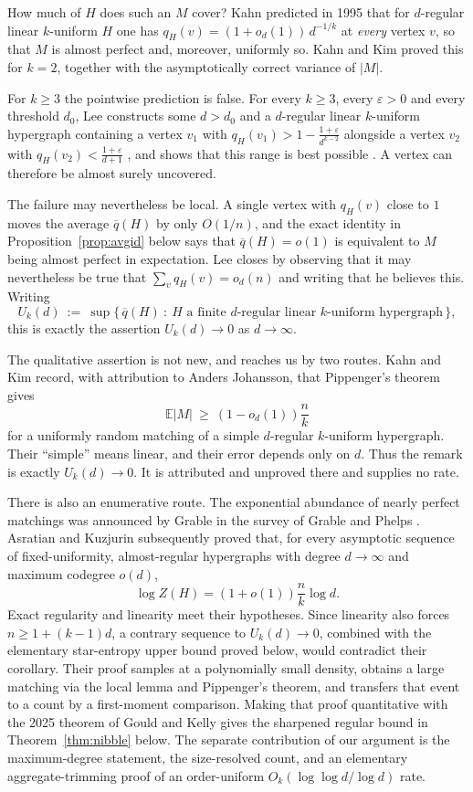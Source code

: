 \documentclass[10pt,a4paper]{amsart}
\newcommand{\EX}{\mathbb{E}}
\newcommand{\qbar}{\overline{q}}
\begin{document}
How much of $H$ does such an $M$ cover? Kahn \cite{Kahn95,Kahn97} predicted in 1995 that
for $d$-regular linear $k$-uniform $H$ one has $q_H(v)=(1+o_d(1))\,d^{-1/k}$ at
\emph{every} vertex $v$, so that $M$ is almost perfect and, moreover, uniformly so. Kahn
and Kim \cite{KahnKim98} proved this for $k=2$, together with the asymptotically correct
variance of $|M|$.

For $k\ge3$ the pointwise prediction is false. For every $k\ge3$, every
$\varepsilon>0$ and every threshold $d_0$, Lee \cite{Lee} constructs some $d>d_0$ and a
$d$-regular linear $k$-uniform hypergraph containing a vertex $v_1$ with
$q_H(v_1)>1-\frac{1+\varepsilon}{d^{k-2}}$ alongside a vertex $v_2$ with
$q_H(v_2)<\frac{1+\varepsilon}{d+1}$ \cite[Theorem 1.4]{Lee}, and shows that this range is
best possible \cite[Theorem 1.5]{Lee}. A vertex can therefore be almost surely uncovered.

The failure may nevertheless be local. A single vertex with $q_H(v)$ close to $1$ moves
the average $\qbar(H)$ by only $O(1/n)$, and the exact identity in
Proposition~\ref{prop:avgid} below says that $\qbar(H)=o(1)$ is equivalent to $M$ being
almost perfect in expectation. Lee closes \cite{Lee} by observing that it may nevertheless
be true that $\sum_v q_H(v)=o_d(n)$ and writing that he believes this.
Writing
\[
  U_k(d)\ :=\ \sup\bigl\{\,\qbar(H)\ :\ H\text{ a finite $d$-regular linear $k$-uniform
  hypergraph}\,\bigr\},
\]
this is exactly the assertion $U_k(d)\to0$ as $d\to\infty$.

The qualitative assertion is not new, and reaches us by two routes. Kahn and Kim
\cite[p.~204]{KahnKim98} record, with attribution to Anders Johansson, that Pippenger's
theorem gives
\[
  \EX|M|\ \ge\ (1-o_d(1))\frac{n}{k}
\]
for a uniformly random matching of a simple $d$-regular $k$-uniform hypergraph. Their
``simple'' means linear, and their error depends only on $d$. Thus the remark is exactly
$U_k(d)\to0$. It is attributed and unproved there and supplies no rate.

There is also an enumerative route. The exponential abundance of nearly perfect
matchings was announced by Grable in the survey of Grable and Phelps
\cite{GrablePhelps}. Asratian and Kuzjurin \cite[Theorem 2 and Corollaries 1--2,
\S3]{AsratianKuzjurin} subsequently proved that, for every asymptotic sequence of
fixed-uniformity, almost-regular hypergraphs with degree $d\to\infty$ and maximum
codegree $o(d)$,
\[
  \log Z(H)=(1+o(1))\frac{n}{k}\log d.
\]
Exact regularity and linearity meet their hypotheses. Since linearity also forces
$n\ge1+(k-1)d$, a contrary sequence to $U_k(d)\to0$, combined with the elementary
star-entropy upper bound proved below, would contradict their corollary. Their proof
samples at a polynomially small density, obtains a large matching via the local lemma and
Pippenger's theorem, and transfers that event to a count by a first-moment comparison.
Making that proof quantitative with the 2025 theorem of Gould and Kelly gives the
sharpened regular bound in Theorem~\ref{thm:nibble} below. The separate contribution of
our argument is the maximum-degree statement, the size-resolved count, and an elementary
aggregate-trimming proof of an order-uniform $O_k(\log\log d/\log d)$ rate.
\end{document}
